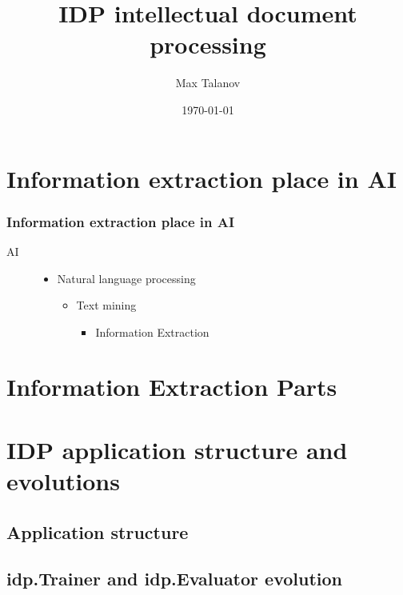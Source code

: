 \documentclass{beamer}
\title{IDP intellectual document processing}
\author{Max Talanov}
\date{\today}
\begin{document}
\frame{\titlepage}

\section[Outline]{}
\frame{\tableofcontents}

\section{Information extraction place in AI}
\frame
{
  \frametitle{Information extraction place in AI}
  \begin{description}
  \item [AI]
    \begin{itemize}
    \item Natural language processing
      \begin{itemize}
      \item Text mining
        \begin{itemize}
          \item Information Extraction
        \end{itemize}
      \end{itemize}
    \end{itemize}
  \end{description}
}
\section{Information Extraction Parts}
\section{IDP application structure and evolutions}
\subsection{Application structure}
\subsection{idp.Trainer and idp.Evaluator evolution}
\end{document}
